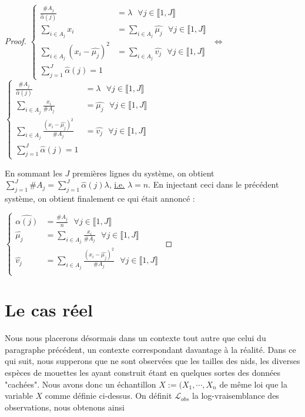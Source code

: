 \documentclass[frenchb]{report}
\newcommand{\1}{\mathbbm{1}}
\theoremstyle{definition}\newtheorem{defn}{Définition}
\theoremstyle{definition}\newtheorem{exm}{Exemple}
\theoremstyle{definition}\newtheorem{nota}{Notation}
\theoremstyle{definition}\newtheorem{rem}{Remarque}
\begin{document}
\begin{proof}
$
\begin{cases}
\displaystyle\frac{\#A_j}{\hat{\alpha}(j)} &= \lambda \text{ } \forall j \in \llbracket 1,J \rrbracket \\
\displaystyle\sum_{i\in A_j}x_i & =\displaystyle\sum_{i\in A_j} \hat{\mu_j} \text{ } \forall j \in \llbracket 1,J \rrbracket \\
\displaystyle\sum_{i\in A_j} (x_i-\hat{\mu_j})^2 &= \displaystyle\sum_{i\in A_j} \hat{v_j}  \text{ } \forall j \in \llbracket 1,J \rrbracket \\
\displaystyle\sum_{j=1}^J \hat{\alpha}(j) = 1
\end{cases}
$
$\Leftrightarrow$
$
\begin{cases}
\displaystyle\frac{\#A_j}{\hat{\alpha}(j)} &= \lambda \text{ } \forall j \in \llbracket 1,J \rrbracket \\
\displaystyle\sum_{i\in A_j}\frac{x_i}{\#A_j} & = \hat{\mu_j} \text{ } \forall j \in \llbracket 1,J \rrbracket \\
\displaystyle\sum_{i\in A_j} \frac{(x_i-\hat{\mu_j})^2}{\#A_j} &=  \hat{v_j}  \text{ } \forall j \in \llbracket 1,J \rrbracket \\
\displaystyle\sum_{j=1}^J \hat{\alpha}(j) = 1
\end{cases}
$

En sommant les $J$ premières lignes du système, on obtient $\displaystyle\sum_{j=1}^J\#A_j = \sum_{j=1}^J\hat{\alpha}(j)\lambda$, \underline{i.e.} $\lambda = n$. En injectant ceci dans le précédent système, on obtient finalement ce qui était annoncé :

$
\begin{cases}
\hat{\alpha(j)} &= \displaystyle \frac{\#A_j}{n} \text{ } \forall j \in \llbracket 1,J \rrbracket \\
\hat{\mu_j} &= \displaystyle\sum_{i\in A_j}\frac{x_i}{\#A_j} \text{ } \forall j \in \llbracket 1,J \rrbracket \\
\hat{v_j} &= \displaystyle\sum_{i\in A_j} \frac{(x_i-\hat{\mu_j})^2}{\#A_j}  \text{ } \forall j \in \llbracket 1,J \rrbracket \\
\end{cases}
$
\end{proof}


\section{Le cas réel}
Nous nous placerons désormais dans un contexte tout autre que celui du paragraphe précédent, un contexte correspondant davantage à la réalité. Dans ce qui suit, nous supperons que ne sont observées que les tailles des nids, les diverses espèces de mouettes les ayant construit étant en quelques sortes des données "cachées". Nous avons donc un échantillon $X := (X_1,\cdots, X_n$ de même loi que la variable $X$ comme définie ci-dessus. \newline
On définit $\mathcal{L}_{obs}$ la log-vraisemblance des observations, nous obtenons ainsi 
\end{document}
